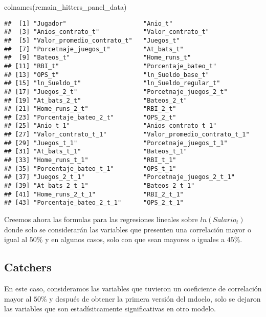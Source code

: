 \documentclass[
]{article}
\newenvironment{Shaded}{\begin{snugshade}}{\end{snugshade}}
\newcommand{\FunctionTok}[1]{\textcolor[rgb]{0.00,0.00,0.00}{#1}}
\newcommand{\NormalTok}[1]{#1}
\begin{document}
\begin{Shaded}
\begin{Highlighting}[]
\FunctionTok{colnames}\NormalTok{(remain\_hitters\_panel\_data)}
\end{Highlighting}
\end{Shaded}

\begin{verbatim}
##  [1] "Jugador"                     "Anio_t"                     
##  [3] "Anios_contrato_t"            "Valor_contrato_t"           
##  [5] "Valor_promedio_contrato_t"   "Juegos_t"                   
##  [7] "Porcetnaje_juegos_t"         "At_bats_t"                  
##  [9] "Bateos_t"                    "Home_runs_t"                
## [11] "RBI_t"                       "Porcentaje_bateo_t"         
## [13] "OPS_t"                       "ln_Sueldo_base_t"           
## [15] "ln_Sueldo_t"                 "ln_Sueldo_regular_t"        
## [17] "Juegos_2_t"                  "Porcetnaje_juegos_2_t"      
## [19] "At_bats_2_t"                 "Bateos_2_t"                 
## [21] "Home_runs_2_t"               "RBI_2_t"                    
## [23] "Porcentaje_bateo_2_t"        "OPS_2_t"                    
## [25] "Anio_t_1"                    "Anios_contrato_t_1"         
## [27] "Valor_contrato_t_1"          "Valor_promedio_contrato_t_1"
## [29] "Juegos_t_1"                  "Porcetnaje_juegos_t_1"      
## [31] "At_bats_t_1"                 "Bateos_t_1"                 
## [33] "Home_runs_t_1"               "RBI_t_1"                    
## [35] "Porcentaje_bateo_t_1"        "OPS_t_1"                    
## [37] "Juegos_2_t_1"                "Porcetnaje_juegos_2_t_1"    
## [39] "At_bats_2_t_1"               "Bateos_2_t_1"               
## [41] "Home_runs_2_t_1"             "RBI_2_t_1"                  
## [43] "Porcentaje_bateo_2_t_1"      "OPS_2_t_1"
\end{verbatim}

Creemos ahora las formulas para las regresiones lineales sobre
\(ln(Salario_{t})\) donde solo se considerarán las variables que
presenten una correlación mayor o igual al \(50\%\) y en algunos casos,
solo con que sean mayores o iguales a \(45\%\).

\subsection{Catchers}

En este caso, consideramos las variables que tuvieron un coeficiente de
correlación mayor al \(50\%\) y después de obtener la primera versión
del mdoelo, solo se dejaron las variables que son estadísitcamente
significativas en otro modelo.
\end{document}
